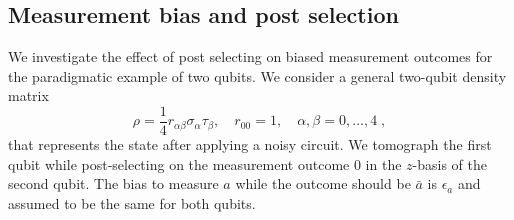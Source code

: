 \documentclass[a4paper,twocolumn,11pt]{quantumarticle}
\begin{document}
 
\subsection{Measurement bias and post selection}\label{app:bias} We investigate the effect of post selecting on biased measurement outcomes for the paradigmatic example of two qubits. We consider a general two-qubit density matrix
\begin{equation}
	\rho=\frac{1}{4} r_{\alpha \beta} \sigma_\alpha \tau_\beta,\quad r_{00}=1,\quad \alpha,\beta=0,\ldots,4\;,
\end{equation} that represents the state after applying a noisy circuit. We tomograph the first qubit while post-selecting on the measurement outcome $0$ in the $z$-basis of the second qubit. The bias to measure $a$ while the outcome should be $\bar a$ is $\epsilon_a$ and assumed to be the same for both qubits. 
\end{document}
